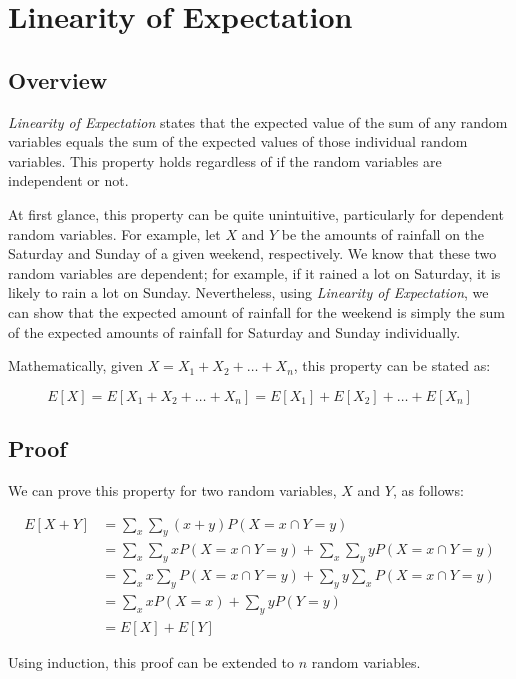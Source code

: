 \documentclass{article}
\date{}
\author{Kaan Aksoy | Feb 20, 2020}
\begin{document}
\maketitle
\section{Linearity of Expectation}
\subsection{Overview}

\textit{Linearity of Expectation} states that the expected 
value of the sum of any random variables equals the 
sum of the expected values of those individual random 
variables. This property holds regardless of if the random 
variables are independent or not.

At first glance, this property can be quite unintuitive, 
particularly for dependent random variables. For example, 
let $X$ and $Y$ be the amounts of rainfall on the Saturday 
and Sunday of a given weekend, respectively. We know that 
these two random variables are dependent; for example, if 
it rained a lot on Saturday, it is likely to rain a lot on 
Sunday. Nevertheless, using \textit{Linearity of Expectation}, 
we can show that the expected amount of rainfall for the 
weekend is simply the sum of the expected amounts of 
rainfall for Saturday and Sunday individually.

Mathematically, given $X = X_{1} + X_2 + \ldots + X_{n}$, 
this property can be stated as:

$$
E[X] = E[X_{1} + X_2 + \ldots + X_{n}] = 
E[X_{1}] + E[X_2] + \ldots + E[X_{n}]
$$

\subsection{Proof}
We can prove this property for two random variables, 
$X$ and $Y$, as follows:

\begin{equation*}
\begin{split}
E[X+Y] &= \sum_{x}\sum_{y}(x+y)P(X=x \cap Y=y) \\
&= \sum_{x}\sum_{y}xP(X=x \cap Y=y) + \sum_{x}\sum_{y}yP(X=x \cap Y=y) \\
&= \sum_{x}x\sum_{y}P(X=x \cap Y=y) + \sum_{y}y\sum_{x}P(X=x \cap Y=y) \\
&= \sum_{x}xP(X=x) + \sum_{y}yP(Y=y) \\
&= E[X] + E[Y]
\end{split}
\end{equation*}

Using induction, this proof can be extended 
to $n$ random variables.
\end{document}

